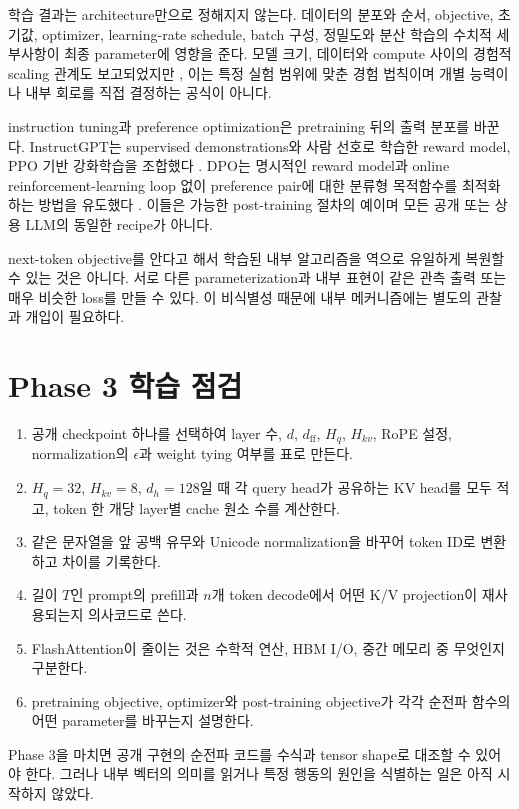 학습 결과는 architecture만으로 정해지지 않는다.
데이터의 분포와 순서, objective, 초기값, optimizer, learning-rate schedule, batch 구성, 정밀도와 분산 학습의 수치적 세부사항이 최종 parameter에 영향을 준다.
모델 크기, 데이터와 compute 사이의 경험적 scaling 관계도 보고되었지만 \citep{kaplan2020scaling,hoffmann2022chinchilla}, 이는 특정 실험 범위에 맞춘 경험 법칙이며 개별 능력이나 내부 회로를 직접 결정하는 공식이 아니다.

instruction tuning과 preference optimization은 pretraining 뒤의 출력 분포를 바꾼다.
InstructGPT는 supervised demonstrations와 사람 선호로 학습한 reward model, PPO 기반 강화학습을 조합했다 \citep{ouyang2022instructgpt,schulman2017ppo}.
DPO는 명시적인 reward model과 online reinforcement-learning loop 없이 preference pair에 대한 분류형 목적함수를 최적화하는 방법을 유도했다 \citep{rafailov2023dpo}.
이들은 가능한 post-training 절차의 예이며 모든 공개 또는 상용 LLM의 동일한 recipe가 아니다.

\begin{limitbox}
next-token objective를 안다고 해서 학습된 내부 알고리즘을 역으로 유일하게 복원할 수 있는 것은 아니다.
서로 다른 parameterization과 내부 표현이 같은 관측 출력 또는 매우 비슷한 loss를 만들 수 있다.
이 비식별성 때문에 내부 메커니즘에는 별도의 관찰과 개입이 필요하다.
\end{limitbox}

\section{Phase 3 학습 점검}

\begin{studybox}
\begin{enumerate}
  \item 공개 checkpoint 하나를 선택하여 layer 수, $d$, $d_{\mathrm{ff}}$, $H_q$, $H_{kv}$, RoPE 설정, normalization의 $\epsilon$과 weight tying 여부를 표로 만든다.
  \item $H_q=32$, $H_{kv}=8$, $d_h=128$일 때 각 query head가 공유하는 KV head를 모두 적고, token 한 개당 layer별 cache 원소 수를 계산한다.
  \item 같은 문자열을 앞 공백 유무와 Unicode normalization을 바꾸어 token ID로 변환하고 차이를 기록한다.
  \item 길이 $T$인 prompt의 prefill과 $n$개 token decode에서 어떤 K/V projection이 재사용되는지 의사코드로 쓴다.
  \item FlashAttention이 줄이는 것은 수학적 연산, HBM I/O, 중간 메모리 중 무엇인지 구분한다.
  \item pretraining objective, optimizer와 post-training objective가 각각 순전파 함수의 어떤 parameter를 바꾸는지 설명한다.
\end{enumerate}
\end{studybox}

\begin{factbox}
Phase 3을 마치면 공개 구현의 순전파 코드를 수식과 tensor shape로 대조할 수 있어야 한다.
그러나 내부 벡터의 의미를 읽거나 특정 행동의 원인을 식별하는 일은 아직 시작하지 않았다.
\end{factbox}
